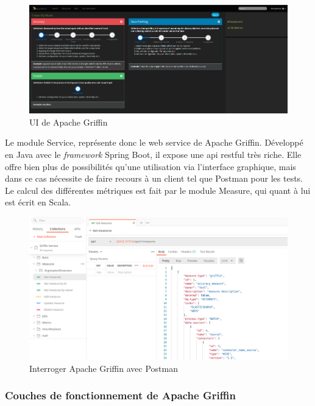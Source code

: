 \begin{figure}[H]
    \caption{UI de Apache Griffin} \label{fig:xray}
    \begin{center}
      \includegraphics[scale=0.25]{Main/Static/UI_griffin.png} 
     \end{center}
\end{figure}
Le module Service, repr\'esente donc le web service de Apache Griffin. Développé en Java avec le \textit{framework} Spring Boot, il expose une \acrshort{api} \acrshort{rest}ful tr\`es riche. Elle offre bien plus de possibilit\'es qu'une utilisation via l'interface graphique, mais dans ce cas n\'ecessite de faire recours \`a un client tel que Postman pour les tests. Le calcul des diff\'erentes m\'etriques est fait par le module Measure, qui quant \`a lui est \'ecrit en Scala. 
\\
\begin{figure}[H]
    \caption{Interroger Apache Griffin avec Postman} \label{fig:xray}
    \begin{center}
      \includegraphics[scale=0.35]{Main/Static/Postman_Griffin.png} 
     \end{center}

\end{figure}
 
\subsubsection{\textbf{Couches de fonctionnement de Apache Griffin}}

